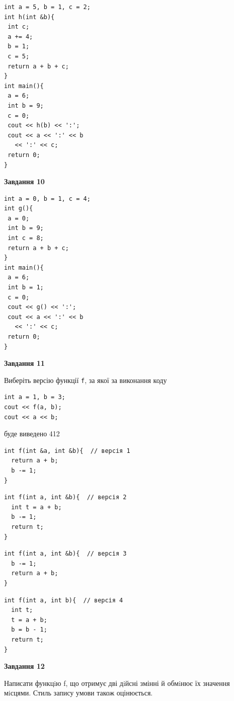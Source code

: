 \documentclass[12pt, ukrainian]{article}
\def\code#1{\Verb!#1!}
\begin{document}
{\begin {large}
\begin{minipage}[t]{7.0cm}
\begin{verbatim}
int a = 5, b = 1, c = 2;
int h(int &b){
 int c;
 a += 4;
 b = 1;
 c = 5;
 return a + b + c;
}
int main(){
 a = 6;
 int b = 9;
 c = 0;
 cout << h(b) << ':';
 cout << a << ':' << b 
   << ':' << c;
 return 0;
}
\end{verbatim}



\begin{center}
\textbf{Завдання 10}
\end{center}
\vspace{-8mm}

\begin{verbatim}
int a = 0, b = 1, c = 4;
int g(){
 a = 0;
 int b = 9;
 int c = 8;
 return a + b + c;
}
int main(){
 a = 6;
 int b = 1;
 c = 0;
 cout << g() << ':';
 cout << a << ':' << b 
   << ':' << c;
 return 0;
}
\end{verbatim}

\end{minipage}
\vline \hspace{1mm}
\begin{minipage}[t]{11.0cm}

\begin{center}
\textbf{Завдання 11}
\end{center}
Виберіть версію функції \code{f}, за якої за виконання коду
\begin{verbatim}
int a = 1, b = 3;
cout << f(a, b);
cout << a << b;
\end{verbatim}

буде виведено 412

\begin{verbatim}
int f(int &a, int &b){  // версія 1
  return a + b;
  b -= 1;
}
\end{verbatim}

\vspace{-8mm}\begin{verbatim}
int f(int a, int &b){  // версія 2
  int t = a + b;
  b -= 1;
  return t;
}
\end{verbatim}

\vspace{-8mm}\begin{verbatim}
int f(int a, int &b){  // версія 3
  b -= 1;
  return a + b;
}
\end{verbatim}

\vspace{-8mm}\begin{verbatim}
int f(int a, int b){  // версія 4
  int t;
  t = a + b;
  b = b - 1;
  return t;
}
\end{verbatim}



\begin{center}
\textbf{Завдання 12}
\end{center}

Написати функцiю f, що отримує дві дiйсні змінні й обмiнює їх значення мiсцями. Стиль запису умови також оцінюється.\par

\end{minipage}

\end {large}}
\newpage
\end{document}
